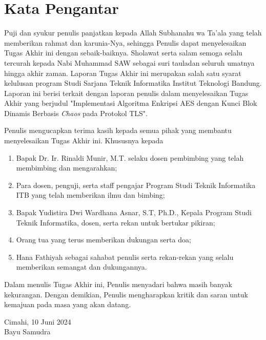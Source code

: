 \chapter*{Kata Pengantar}

Puji dan syukur penulis panjatkan kepada Allah Subhanahu wa Ta'ala yang telah memberikan rahmat dan karunia-Nya, sehingga Penulis dapat menyelesaikan Tugas Akhir ini dengan sebaik-baiknya. Sholawat serta salam semoga selalu tercurah kepada Nabi Muhammad SAW sebagai suri tauladan seluruh umatnya hingga akhir zaman. Laporan Tugas Akhir ini merupakan salah satu syarat kelulusan program Studi Sarjana Teknik Informatika Institut Teknologi Bandung. Laporan ini berisi terkait dengan laporan penulis dalam menyelesaikan Tugas Akhir yang berjudul "Implementasi Algoritma Enkripsi AES dengan Kunci Blok Dinamis Berbasis \emph{Chaos} pada Protokol TLS".

Penulis mengucapkan terima kasih kepada semua pihak yang membantu menyelesaikan Tugas Akhir ini. Khususnya kepada
\begin{enumerate}
  \item Bapak Dr. Ir. Rinaldi Munir, M.T. selaku dosen pembimbing yang telah membimbing dan mengarahkan;
  \item Para dosen, penguji, serta staff pengajar Program Studi Teknik Informatika ITB yang telah memberikan ilmu dan bimbing;
  \item Bapak Yudistira Dwi Wardhana Asnar, S.T, Ph.D., Kepala Program Studi Teknik Informatika, dosen, serta rekan untuk bertukar pikiran;
  \item Orang tua yang terus memberikan dukungan serta doa;
  \item Hana Fathiyah sebagai sahabat penulis serta rekan-rekan yang selalu memberikan semangat dan dukungannya.
\end{enumerate}

Dalam menulis Tugas Akhir ini, Penulis menyadari bahwa masih banyak kekurangan. Dengan demikian, Penulis mengharapkan kritik dan saran untuk kemajuan pada masa yang akan datang.

\begin{flushright}
  Cimahi, 10 Juni 2024 \\

  Bayu Samudra
\end{flushright}